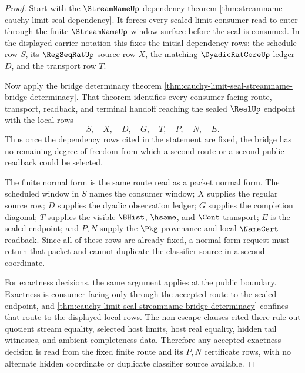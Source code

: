 \begin{proof}
Start with the $\StreamNameUp$ dependency theorem \autoref{thm:streamname-cauchy-limit-seal-dependency}. It forces every sealed-limit consumer read to enter through the finite $\StreamNameUp$ window surface before the seal is consumed. In the displayed carrier notation this fixes the initial dependency rows: the schedule row $S$, its $\RegSeqRatUp$ source row $X$, the matching $\DyadicRatCoreUp$ ledger $D$, and the transport row $T$.

Now apply the bridge determinacy theorem \autoref{thm:cauchy-limit-seal-streamname-bridge-determinacy}. That theorem identifies every consumer-facing route, transport, readback, and terminal handoff reaching the sealed $\RealUp$ endpoint with the local rows
$$
S,\quad X,\quad D,\quad G,\quad T,\quad P,\quad N,\quad E.
$$
Thus once the dependency rows cited in the statement are fixed, the bridge has no remaining degree of freedom from which a second route or a second public readback could be selected.

The finite normal form is the same route read as a packet normal form. The scheduled window in $S$ names the consumer window; $X$ supplies the regular source row; $D$ supplies the dyadic observation ledger; $G$ supplies the completion diagonal; $T$ supplies the visible $\BHist$, $\hsame$, and $\Cont$ transport; $E$ is the sealed endpoint; and $P,N$ supply the $\Pkg$ provenance and local $\NameCert$ readback. Since all of these rows are already fixed, a normal-form request must return that packet and cannot duplicate the classifier source in a second coordinate.

For exactness decisions, the same argument applies at the public boundary. Exactness is consumer-facing only through the accepted route to the sealed endpoint, and \autoref{thm:cauchy-limit-seal-streamname-bridge-determinacy} confines that route to the displayed local rows. The non-escape clauses cited there rule out quotient stream equality, selected host limits, host real equality, hidden tail witnesses, and ambient completeness data. Therefore any accepted exactness decision is read from the fixed finite route and its $P,N$ certificate rows, with no alternate hidden coordinate or duplicate classifier source available.
\end{proof}

